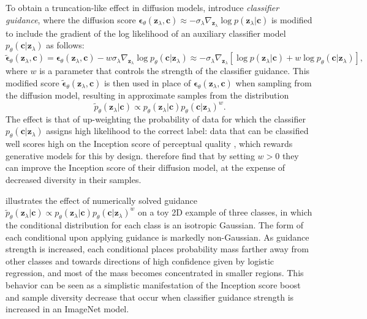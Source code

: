 \documentclass{article} %
\newcommand{\bc}{\mathbf{c}}
\newcommand{\bz}{\mathbf{z}}
\newcommand{\bepsilon}{{\boldsymbol{\epsilon}}}
\begin{document}
To obtain a truncation-like effect in diffusion models, \citet{dhariwal2021diffusion} introduce \emph{classifier guidance}, where the diffusion score $\bepsilon_\theta(\bz_\lambda, \bc) \approx -\sigma_\lambda \nabla_{\bz_\lambda}\log p(\bz_\lambda |  \bc)$ is modified to include the gradient of the log likelihood of an auxiliary classifier model $p_{\theta}(\bc | \bz_\lambda)$ as follows:
\[
\tilde{\bepsilon}_\theta(\bz_\lambda, \bc) = \bepsilon_\theta(\bz_\lambda, \bc) - w\sigma_{\lambda}\nabla_{\bz_\lambda}\log p_{\theta}(\bc | \bz_\lambda) \approx -\sigma_{\lambda}\nabla_{\bz_\lambda}[\log p(\bz_\lambda |  \bc) + w \log p_{\theta}(\bc | \bz_\lambda) ],
\]
where $w$ is a parameter that controls the strength of the classifier guidance. This modified score $\tilde{\bepsilon}_\theta(\bz_\lambda, \bc)$ is then used in place of $\bepsilon_\theta(\bz_\lambda, \bc)$ when sampling from the diffusion model, resulting in approximate samples from the distribution
\[\tilde{p}_{\theta}(\bz_\lambda | \bc) \propto p_{\theta}(\bz_\lambda | \bc)p_{\theta}(\bc | \bz_\lambda)^{w}.\]
The effect is that of up-weighting the probability of data for which the classifier $p_{\theta}(\bc | \bz_\lambda)$ assigns high likelihood to the correct label: data that can be classified well scores high on the Inception score of perceptual quality \citep{salimans2016improved}, which rewards generative models for this by design. \citeauthor{dhariwal2021diffusion}
therefore find that by setting $w > 0$ they can improve the Inception score of their diffusion model, at the expense of decreased diversity in their samples.

 illustrates the effect of numerically solved guidance $\tilde{p}_{\theta}(\bz_\lambda | \bc) \propto p_{\theta}(\bz_\lambda | \bc)p_{\theta}(\bc | \bz_\lambda)^{w}$ on a toy 2D example of three classes, in which the conditional distribution for each class is an isotropic Gaussian. The form of each conditional upon applying guidance is markedly non-Gaussian. As guidance strength is increased, each conditional places probability mass farther away from other classes and towards directions of high confidence given by logistic regression, and most of the mass becomes concentrated in smaller regions. This behavior can be seen as a simplistic manifestation of the Inception score boost and sample diversity decrease that occur when classifier guidance strength is increased in an ImageNet model.
\end{document}
